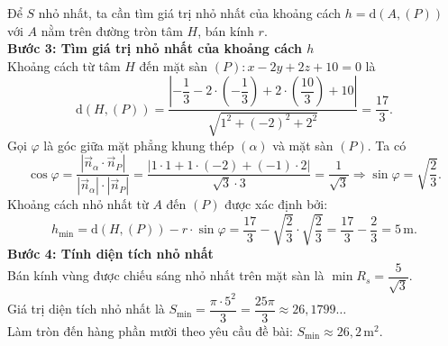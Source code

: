 \begin{ex}
{		Để $S$ nhỏ nhất, ta cần tìm giá trị nhỏ nhất của khoảng cách $h = \mathrm{d}(A,(P))$ với $A$ nằm trên đường tròn tâm $H$, bán kính $r$. \\
		\textbf{Bước 3: Tìm giá trị nhỏ nhất của khoảng cách $h$} \\
		Khoảng cách từ tâm $H$ đến mặt sàn $(P) \colon x-2y+2z+10=0$ là
		\[\mathrm{d}(H,(P)) = \dfrac{\left| -\dfrac{1}{3} - 2 \cdot \left(-\dfrac{1}{3}\right) + 2 \cdot \left(\dfrac{10}{3}\right) + 10 \right|}{\sqrt{1^2 + (-2)^2 + 2^2}} = \dfrac{17}{3}.\]
		Gọi $\varphi$ là góc giữa mặt phẳng khung thép $(\alpha)$ và mặt sàn $(P)$. Ta có
		\[\cos \varphi = \dfrac{|\vec{n}_{\alpha} \cdot \vec{n}_P|}{|\vec{n}_{\alpha}| \cdot |\vec{n}_P|} = \dfrac{|1 \cdot 1 + 1 \cdot (-2) + (-1) \cdot 2|}{\sqrt{3} \cdot 3} = \dfrac{1}{\sqrt{3}} \Rightarrow \sin \varphi = \sqrt{\dfrac{2}{3}}.\]
		Khoảng cách nhỏ nhất từ $A$ đến $(P)$ được xác định bởi:
		\[h_{\min} = \mathrm{d}(H,(P)) - r \cdot \sin \varphi = \dfrac{17}{3} - \sqrt{\dfrac{2}{3}} \cdot \sqrt{\dfrac{2}{3}} = \dfrac{17}{3} - \dfrac{2}{3} = 5\,\mathrm{m}.\]
		\textbf{Bước 4: Tính diện tích nhỏ nhất} \\
		Bán kính vùng được chiếu sáng nhỏ nhất trên mặt sàn là $\min R_s = \dfrac{5}{\sqrt{3}}$. \\
		Giá trị diện tích nhỏ nhất là $S_{\min} = \dfrac{\pi \cdot 5^2}{3} = \dfrac{25\pi}{3} \approx 26,1799 \ldots$ \\
		Làm tròn đến hàng phần mười theo yêu cầu đề bài: $S_{\min} \approx 26,2\,\mathrm{m}^2$.
	}
\end{ex}

